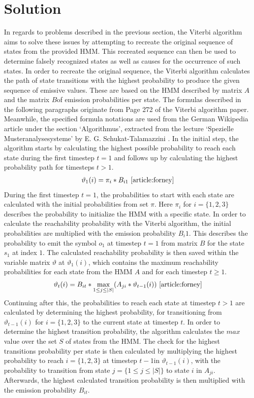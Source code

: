 \documentclass[12pt,journal,compsoc]{IEEEtran}
\begin{document}
\section{Solution}
In regards to problems described in the previous section, the Viterbi algorithm aims to solve these issues by attempting to recreate the original sequence of states from the provided HMM. This recreated sequence can then be used to determine falsely recognized states as well as causes for the occurrence of such states. In order to recreate the original sequence, the Viterbi algorithm calculates the path of state transitions with the highest probability to produce the given sequence of emissive values. These are based on the HMM described by matrix $A$ and the matrix $B$of emission probabilities per state. The formulas described in the following paragraphs originate from Page 272 of the Viterbi algorithm \cite{article:forney} paper. Meanwhile, the specified formula notations are used from the German Wikipedia article under the section ‘Algorithmus’, extracted from the lecture ‘Spezielle Musteranalysesysteme’ by E. G. Schukat-Talamazzini \cite{lecture:patternAnalysis}. In the initial step, the algorithm starts by calculating the highest possible probability to reach each state during the first timestep $t=1$ and follows up by calculating the highest probability path for timesteps $t > 1$.
\begin{align*}
	\displaystyle \vartheta_{1}(i)=\pi_{i}*B_{i1} \text{ \cite{article:forney}}
\end{align*}
During the first timestep $t=1$, the probabilities to start with each state are calculated with the initial probabilities from set $\pi$. Here $\pi_{i}$ for $i=\{1,2,3\}$ describes the probability to initialize the HMM with a specific state. In order to calculate the reachability probability with the Viterbi algorithm, the initial probabilities are multiplied with the emission probability $B_{i}1$. This describes the probability to emit the symbol $o_1$  at timestep $t=1$ from matrix $B$ for the state $s_1$  at index $1$. The calculated reachability probability is then saved within the variable matrix $\vartheta$  at $\vartheta_{1}(i)$, which contains the maximum reachability probabilities for each state from the HMM $A$  and for each timestep $t \geq 1$.
\begin{align*}
	\displaystyle \vartheta_{t}(i)=B_{it}*\max_{1\leq j\leq\mid S\mid}(A_{ji}*\vartheta_{t-1}(i)) \text{ \cite{article:forney}}
\end{align*}
Continuing after this, the probabilities to reach each state at timestep $t > 1$ are calculated by determining the highest probability, for transitioning from $\vartheta_{t-1}(i)$ for $i=\{1,2,3\}$ to the current state at timestep $t$. In order to determine the highest transition probability, the algorithm calculates the $max$ value over the set $S$ of states from the HMM. The check for the highest transitions probability per state is then calculated by multiplying the highest probability to reach $i=\{1,2,3\}$ at timestep $t-1$in $\vartheta_{t-1}(i)$, with the probability to transition from state $j=\{1\leq j\leq\mid S\mid\}$ to state $i$ in $A_{ji}$. Afterwards, the highest calculated transition probability is then multiplied with the emission probability $B_{it}$.
\end{document}
